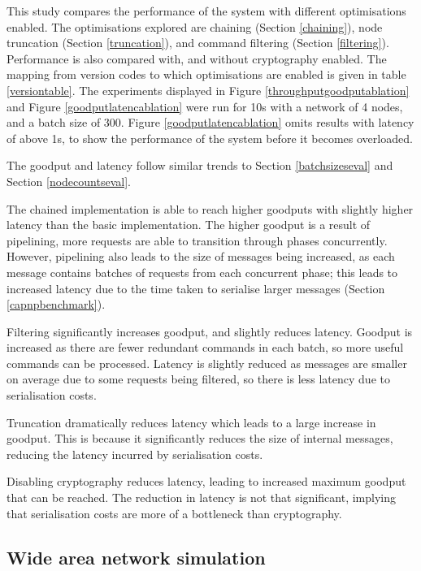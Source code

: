 This study compares the performance of the system with different optimisations enabled. The optimisations explored are chaining (Section \ref{chaining}), node truncation (Section \ref{truncation}), and command filtering (Section \ref{filtering}). Performance is also compared with, and without cryptography enabled. The mapping from version codes to which optimisations are enabled is given in table \ref{versiontable}. The experiments displayed in Figure \ref{throughputgoodputablation} and Figure \ref{goodputlatencablation} were run for 10s with a network of 4 nodes, and a batch size of 300. Figure \ref{goodputlatencablation} omits results with latency of above 1s, to show the performance of the system before it becomes overloaded.

The goodput and latency follow similar trends to Section \ref{batchsizeseval} and Section \ref{nodecountseval}.

The chained implementation is able to reach higher goodputs with slightly higher latency than the basic implementation. The higher goodput is a result of pipelining, more requests are able to transition through phases concurrently. However, pipelining also leads to the size of messages being increased, as each message contains batches of requests from each concurrent phase; this leads to increased latency due to the time taken to serialise larger messages (Section \ref{capnpbenchmark}).

Filtering significantly increases goodput, and slightly reduces latency. Goodput is increased as there are fewer redundant commands in each batch, so more useful commands can be processed. Latency is slightly reduced as messages are smaller on average due to some requests being filtered, so there is less latency due to serialisation costs.

Truncation dramatically reduces latency which leads to a large increase in goodput. This is because it significantly reduces the size of internal messages, reducing the latency incurred by serialisation costs.

Disabling cryptography reduces latency, leading to increased maximum goodput that can be reached. The reduction in latency is not that significant, implying that serialisation costs are more of a bottleneck than cryptography.

\subsection{Wide area network simulation} \label{minineteval}

